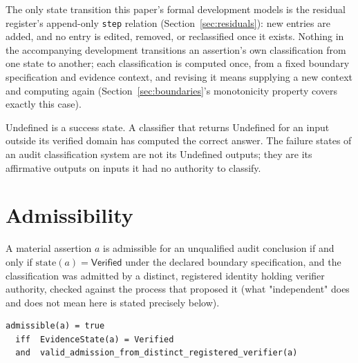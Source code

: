 \documentclass[smallcondensed,envcountsect,natbib]{svjour3}
\newcommand{\state}[1]{\textsf{#1}}
\begin{document}
The only state transition this paper's formal development models is the residual register's append-only \texttt{step} relation (Section~\ref{sec:residuals}): new entries are added, and no entry is edited, removed, or reclassified once it exists. Nothing in the accompanying development transitions an assertion's own classification from one state to another; each classification is computed once, from a fixed boundary specification and evidence context, and revising it means supplying a new context and computing again (Section~\ref{sec:boundaries}'s monotonicity property covers exactly this case).

\begin{remark}
\state{Undefined} is a success state. A classifier that returns \state{Undefined} for an input outside its verified domain has computed the correct answer. The failure states of an audit classification system are not its \state{Undefined} outputs; they are its affirmative outputs on inputs it had no authority to classify.
\end{remark}

\section{Admissibility}
\label{sec:admissibility}

\begin{definition}[Admissibility]
\label{def:admissibility}
A material assertion $a$ is admissible for an unqualified audit conclusion if and only if $\mathrm{state}(a) = \state{Verified}$ under the declared boundary specification, and the classification was admitted by a distinct, registered identity holding verifier authority, checked against the process that proposed it (what "independent" does and does not mean here is stated precisely below).
\end{definition}

\begin{lstlisting}
admissible(a) = true
  iff  EvidenceState(a) = Verified
  and  valid_admission_from_distinct_registered_verifier(a)
\end{lstlisting}
\end{document}
